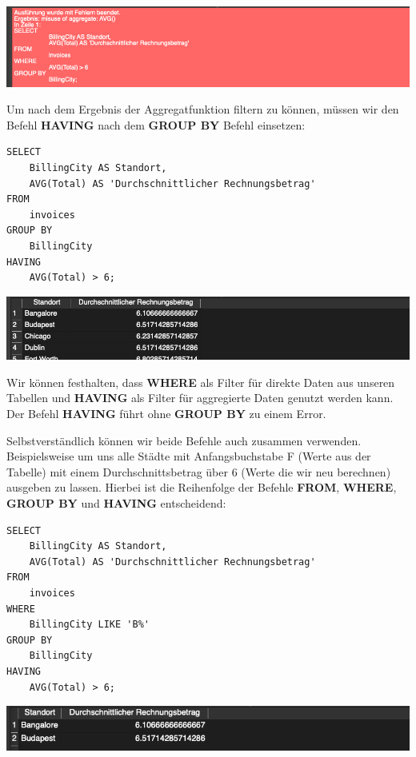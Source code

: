 \documentclass[
]{book}
\begin{document}
\includegraphics[width=10.41667in,height=\textheight]{img-FUNC5.png}

Um nach dem Ergebnis der Aggregatfunktion filtern zu können, müssen wir den Befehl \textbf{HAVING} nach dem \textbf{GROUP BY} Befehl einsetzen:

\begin{verbatim}
SELECT
    BillingCity AS Standort,
    AVG(Total) AS 'Durchschnittlicher Rechnungsbetrag'
FROM
    invoices
GROUP BY
    BillingCity
HAVING
    AVG(Total) > 6;
\end{verbatim}

\includegraphics[width=10.41667in,height=\textheight]{img-FUNC6.png}

Wir können festhalten, dass \textbf{WHERE} als Filter für direkte Daten aus unseren Tabellen und \textbf{HAVING} als Filter für aggregierte Daten genutzt werden kann. Der Befehl \textbf{HAVING} führt ohne \textbf{GROUP BY} zu einem Error.

Selbstverständlich können wir beide Befehle auch zusammen verwenden. Beispielsweise um uns alle Städte mit Anfangsbuchstabe F (Werte aus der Tabelle) mit einem Durchschnittsbetrag über 6 (Werte die wir neu berechnen) ausgeben zu lassen. Hierbei ist die Reihenfolge der Befehle \textbf{FROM}, \textbf{WHERE}, \textbf{GROUP BY} und \textbf{HAVING} entscheidend:

\begin{verbatim}
SELECT
    BillingCity AS Standort,
    AVG(Total) AS 'Durchschnittlicher Rechnungsbetrag'
FROM
    invoices
WHERE
    BillingCity LIKE 'B%'
GROUP BY
    BillingCity
HAVING
    AVG(Total) > 6;
\end{verbatim}

\includegraphics[width=10.41667in,height=\textheight]{img-FUNC7.png}
\end{document}
